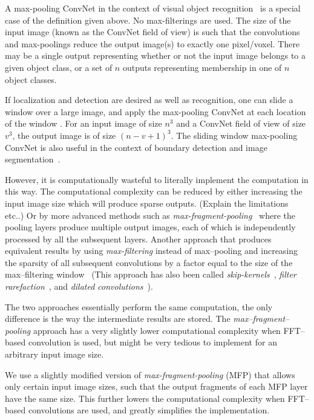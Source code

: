 \documentclass[conference]{IEEEtran}
\begin{document}
  A max-pooling ConvNet in the context of visual object
  recognition~\cite{krizhevsky2012imagenet} is a special case of the
  definition given above.  No max-filterings are used.  The size of
  the input image (known as the ConvNet field of view) is such that
  the convolutions and max-poolings reduce the output image(s) to
  exactly one pixel/voxel.  There may be a single output representing
  whether or not the input image belongs to a given object class, or a
  set of $n$ outputs representing membership in one of $n$ object
  classes.

  If localization and detection are desired as well as recognition,
  one can slide a window over a large image, and apply the max-pooling
  ConvNet at each location of the window
  \cite{sermanet2013overfeat}. For an input image of size $n^3$ and a
  ConvNet field of view of size $v^3$, the output image is of size
  $(n-v+1)^3$.  The sliding window max-pooling ConvNet is also useful
  in the context of boundary detection and image
  segmentation~\cite{ciresan2012deep}.

  However, it is computationally wasteful to literally implement the
  computation in this way.  The computational complexity can be
  reduced by either increasing the input image size which will produce
  sparse outputs. (Explain the limitations etc..) Or by more advanced
  methods such as
  \emph{max-fragment-pooling}~\cite{giusti2013fast,masci2013fast}
  where the pooling layers produce multiple output images, each of
  which is independently processed by all the subsequent layers.
  Another approach that produces equivalent results by using
  \emph{max-filtering} instead of max--pooling and increasing the
  sparsity of all subsequent convolutions by a factor equal to the
  size of the max--filtering window~\cite{zlateski2015znn} (This
  approach has also been called
  \emph{skip-kernels}~\cite{sermanet2013overfeat}, \emph{filter
    rarefaction}~\cite{long2015fully}, and \emph{dilated
    convolutions}~\cite{yu2015multi}).

  The two approaches essentially perform the same computation, the
  only difference is the way the intermediate results are stored.  The
  \emph{max--fragment--pooling} approach has a very slightly
  lower computational complexity when FFT--based convolution is used,
  but might be very tedious to implement for an arbitrary input image
  size.

  We use a slightly modified version of
  \emph{max-fragment-pooling} (MFP) that allows only certain
  input image sizes, such that the output fragments of each MFP layer
  have the same size.  This further lowers the computational
  complexity when FFT--based convolutions are used, and greatly
  simplifies the implementation.
\end{document}
